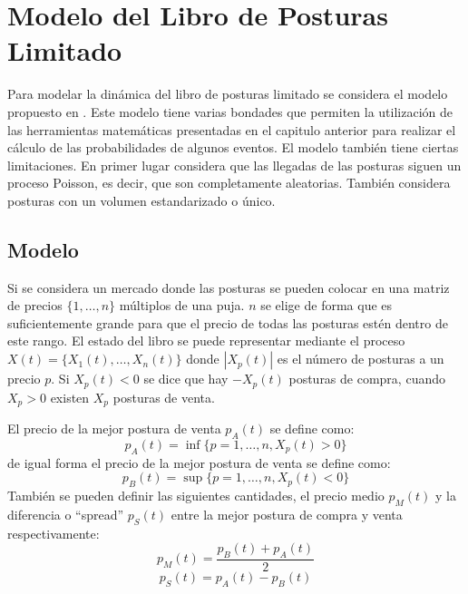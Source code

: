 \documentclass[11pt]{article}
\numberwithin{equation}{section} %
\begin{document}
\clearpage

\section{Modelo del Libro de Posturas Limitado}

Para modelar la dinámica del libro de posturas limitado se considera el modelo propuesto en \cite{Cont2010}. Este modelo tiene varias bondades que permiten la utilización de las herramientas matemáticas presentadas en el capitulo anterior para realizar el cálculo de las probabilidades de algunos eventos. El modelo también tiene ciertas limitaciones. En primer lugar considera que las llegadas de las posturas siguen un proceso Poisson, es decir, que son completamente aleatorias. También considera posturas con un volumen estandarizado o único.\\

\subsection{Modelo}

Si se considera un mercado donde las posturas se pueden colocar en una matriz de precios $\{1,\ldots,n\}$ múltiplos de una puja. $n$ se elige de forma que es suficientemente grande para que el precio de todas las posturas estén dentro de este rango. El estado del libro se puede representar mediante el proceso $X(t)=\{X_1(t),\ldots,X_n(t)\}$ donde $|X_p(t)|$ es el número de posturas a un precio $p$. Si $X_p(t)<0$ se dice que hay $-X_p(t)$ posturas de compra, cuando $X_p>0$ existen $X_p$ posturas de venta.

El precio de la mejor postura de venta $p_A(t)$ se define como:
\[
p_A(t)= \inf\{p=1,\ldots,n,X_p(t)>0\}
\]
de igual forma el precio de la mejor postura de venta se define como:
\[
p_B(t)= \sup\{p=1,\ldots,n,X_p(t)<0\}
\]
También se pueden definir las siguientes cantidades, el precio medio $p_M(t)$ y la diferencia o ``spread'' $p_S(t)$ entre la mejor postura de compra y venta respectivamente:
\[
p_M(t)=\frac{p_B(t)+p_A(t)}{2}
\]
\[
p_S(t)=p_A(t)-p_B(t)
\]\\
\end{document}
